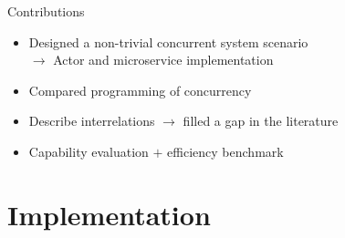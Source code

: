\documentclass{beamer}
\begin{document}

\begin{frame}{Contributions}

\begin{itemize}
  \item Designed a non-trivial concurrent system scenario \\%
        $\rightarrow$ Actor and microservice implementation
  \item Compared programming of concurrency
  \item Describe interrelations $\rightarrow$ filled a gap in the literature
  \item Capability evaluation $+$ efficiency benchmark
\end{itemize}

\end{frame}


\section{Implementation}

\end{document}
